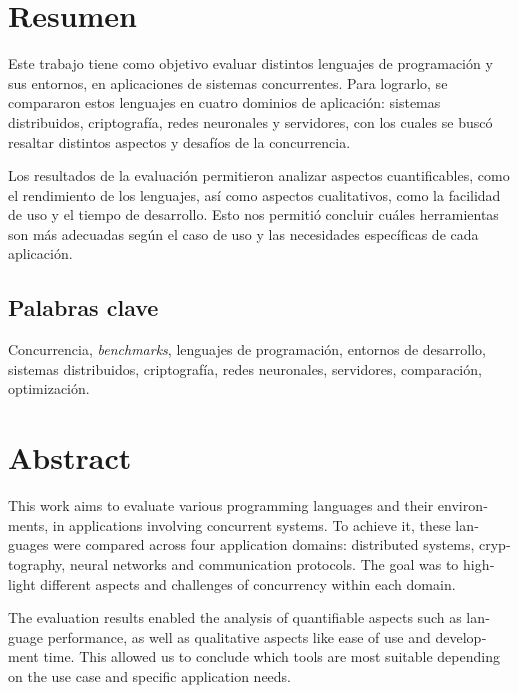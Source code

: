 \documentclass[11pt]{article}
\let\Oldsection\section
\renewcommand{\section}{\FloatBarrier\Oldsection}
\let\Oldsubsection\subsection
\renewcommand{\subsection}{\FloatBarrier\Oldsubsection}
\newcommand{\english}[1]{\textit{#1}}
\begin{document}


\tableofcontents
\newpage

\section{Resumen}


Este trabajo tiene como objetivo evaluar distintos lenguajes de programación y sus entornos, en aplicaciones de sistemas concurrentes. Para lograrlo, se compararon estos lenguajes en cuatro dominios de aplicación: sistemas distribuidos, criptografía, redes neuronales y servidores, con los cuales se buscó resaltar distintos aspectos y desafíos de la concurrencia.

Los resultados de la evaluación permitieron analizar aspectos cuantificables, como el rendimiento de los lenguajes, así como aspectos cualitativos, como la facilidad de uso y el tiempo de desarrollo. Esto nos permitió concluir cuáles herramientas son más adecuadas según el caso de uso y las necesidades específicas de cada aplicación.

\subsection{Palabras clave}

Concurrencia, \english{benchmarks}, lenguajes de programación, entornos de desarrollo, sistemas distribuidos, criptografía, redes neuronales, servidores, comparación, optimización.

\newpage

\section{Abstract}

\begin{otherlanguage}{english}
This work aims to evaluate various programming languages and their environments, in applications involving concurrent systems. To achieve it, these languages were compared across four application domains: distributed systems, cryptography, neural networks and communication protocols. The goal was to highlight different aspects and challenges of concurrency within each domain.

The evaluation results enabled the analysis of quantifiable aspects such as language performance, as well as qualitative aspects like ease of use and development time. This allowed us to conclude which tools are most suitable depending on the use case and specific application needs.
\end{otherlanguage}
\end{document}
